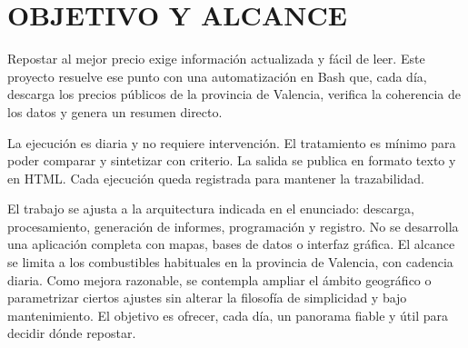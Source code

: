 \chapter{OBJETIVO Y ALCANCE}

Repostar al mejor precio exige información actualizada y fácil de leer. Este proyecto resuelve ese punto con una automatización en Bash que, cada día, descarga los precios públicos de la provincia de Valencia, verifica la coherencia de los datos y genera un resumen directo.

La ejecución es diaria y no requiere intervención. El tratamiento es mínimo para poder comparar y sintetizar con criterio. La salida se publica en formato texto y en HTML. Cada ejecución queda registrada para mantener la trazabilidad.

El trabajo se ajusta a la arquitectura indicada en el enunciado: descarga, procesamiento, generación de informes, programación y registro. No se desarrolla una aplicación completa con mapas, bases de datos o interfaz gráfica. El alcance se limita a los combustibles habituales en la provincia de Valencia, con cadencia diaria. Como mejora razonable, se contempla ampliar el ámbito geográfico o parametrizar ciertos ajustes sin alterar la filosofía de simplicidad y bajo mantenimiento. El objetivo es ofrecer, cada día, un panorama fiable y útil para decidir dónde repostar.
